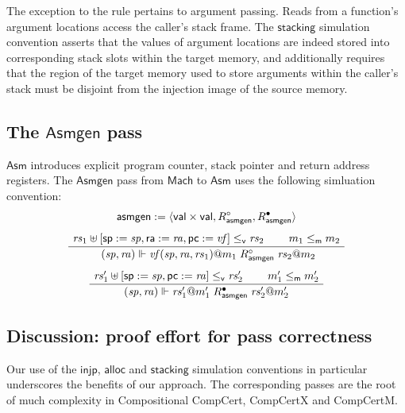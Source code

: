 \documentclass[acmsmall,authordraft]{acmart}
\newcommand{\kw}[1]{\ensuremath{ \mathsf{#1} }}
\newcommand{\que}{\circ}
\newcommand{\ans}{\bullet}
\newcommand{\vref}{\le_\kw{v}}
\newcommand{\mext}{\le_\kw{m}}
\begin{document}
The exception to the rule pertains to argument passing.
Reads from a function's argument locations
access the caller's stack frame.
The \kw{stacking} simulation convention
asserts that the values of argument locations
are indeed stored into corresponding stack slots
within the target memory,
and additionally
requires that the region of the target memory
used to store arguments within the caller's stack
must be disjoint from the injection image of the source memory.


\subsection{The \kw{Asmgen} pass} %

\kw{Asm} introduces explicit
program counter, stack pointer and return address registers.
The \kw{Asmgen} pass from \kw{Mach} to \kw{Asm}
uses the following simluation convention:
\begin{gather*}
  \kw{asmgen} := \langle \kw{val} \times \kw{val},
    R_\kw{asmgen}^\que, R_\kw{asmgen}^\ans \rangle
  \\[1ex]
  \AxiomC{$\mathit{rs}_1 \uplus
    [\kw{sp} := \mathit{sp}, \kw{ra} := \mathit{ra}, \kw{pc} := \mathit{vf}]
    \vref \mathit{rs}_2$}
  \AxiomC{$m_1 \mext m_2$}
  \BinaryInfC{
    $(\mathit{sp}, \mathit{ra}) \Vdash
     \mathit{vf}(\mathit{sp}, \mathit{ra}, \mathit{rs}_1)@m_1
     \mathrel{R_\kw{asmgen}^\que}
     \mathit{rs}_2@m_2$}
  \DisplayProof
  \\[1ex]
  \AxiomC{$
    \mathit{rs}_1' \uplus [\kw{sp} := \mathit{sp}, \kw{pc} := \mathit{ra}]
    \vref \mathit{rs}_2'$}
  \AxiomC{$m_1' \mext m_2'$}
  \BinaryInfC{$
    (\mathit{sp}, \mathit{ra}) \Vdash \mathit{rs}_1'@m_1'
    \mathrel{R_\kw{asmgen}^\ans}
    \mathit{rs}_2'@m_2'$}
  \DisplayProof
\end{gather*}


\subsection{Discussion: proof effort for pass correctness} %

Our use of the \kw{injp}, \kw{alloc} and \kw{stacking}
simulation conventions in particular
underscores the benefits of our approach.
The corresponding passes are the root of
much complexity
in Compositional CompCert, CompCertX and CompCertM.
\end{document}

